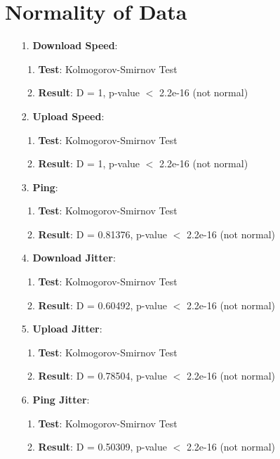 \documentclass[conference]{IEEEtran}
\begin{document}
\section{Normality of Data}
\begin{enumerate}
    \item[1.]    
    \textbf{Download Speed}: 
    \begin{enumerate}
        \item \textbf{Test}: Kolmogorov-Smirnov Test
        \item \textbf{Result}: D = 1, p-value $<$ 2.2e-16 (not normal)
    \end{enumerate}

    \item[2.]
    \textbf{Upload Speed}:
    \begin{enumerate}
        \item \textbf{Test}: Kolmogorov-Smirnov Test
        \item \textbf{Result}: D = 1, p-value $<$ 2.2e-16 (not normal)
    \end{enumerate}

    \item[3.]
    \textbf{Ping}:
    \begin{enumerate}
        \item \textbf{Test}: Kolmogorov-Smirnov Test
        \item \textbf{Result}: D = 0.81376, p-value $<$ 2.2e-16 (not normal)
    \end{enumerate}

    \item[4.] 
    \textbf{Download Jitter}: 
    \begin{enumerate}
        \item \textbf{Test}: Kolmogorov-Smirnov Test
        \item \textbf{Result}: D = 0.60492, p-value $<$ 2.2e-16 (not normal)
    \end{enumerate}

    \item[5.] 
    \textbf{Upload Jitter}: 
    \begin{enumerate}
        \item \textbf{Test}: Kolmogorov-Smirnov Test
        \item \textbf{Result}: D = 0.78504, p-value $<$ 2.2e-16 (not normal)
    \end{enumerate}

    \item[6.] 
    \textbf{Ping Jitter}: 
    \begin{enumerate}
        \item \textbf{Test}: Kolmogorov-Smirnov Test
        \item \textbf{Result}: D = 0.50309, p-value $<$ 2.2e-16 (not normal)
    \end{enumerate}


\end{enumerate}
\end{document}
